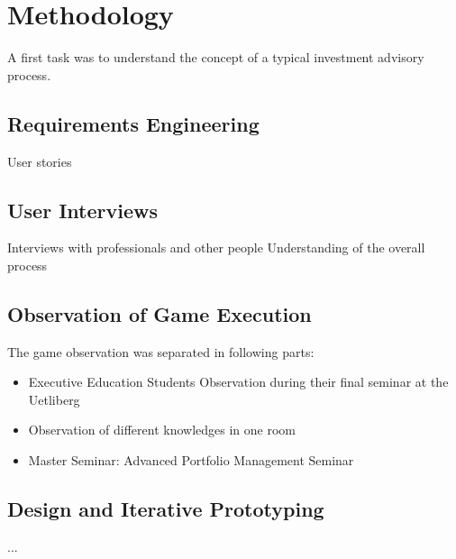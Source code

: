 \section{Methodology}
A first task was to understand the concept of a typical investment advisory process.

\subsection{Requirements Engineering}
User stories

\subsection{User Interviews}
Interviews with professionals and other people
Understanding of the overall process

\subsection{Observation of Game Execution}
The game observation was separated in following parts:
\begin{itemize}
  \item Executive Education Students Observation during their final seminar at the Uetliberg
  \item Observation of different knowledges in one room
  \item Master Seminar: Advanced Portfolio Management Seminar
\end{itemize}

\subsection{Design and Iterative Prototyping}
...
